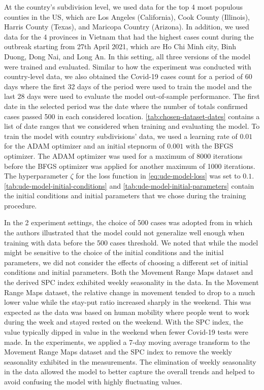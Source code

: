 At the country's subdivision level, we used data for the top 4 most populous counties in the \gls{US}, which are Los Angeles (California), Cook County (Illinois), Harris County (Texas), and Maricopa Country (Arizona).
In addition, we used data for the 4 provinces in Vietnam that had the highest cases count during the outbreak starting from 27th April 2021, which are Ho Chi Minh city, Binh Duong, Dong Nai, and Long An.
In this setting, all three versions of the model were trained and evaluated.
Similar to how the experiment was conducted with country-level data, we also obtained the Covid-19 cases count for a period of 60 days where the first 32 days of the period were used to train the model and the last 28 days were used to evaluate the model out-of-sample performance.
The first date in the selected period was the date where the number of totals confirmed cases passed 500 in each considered location.
\autoref{tab:chosen-dataset-dates} contains a list of date ranges that we considered when training and evaluating the model.
To train the model with country subdivisions' data, we used a learning rate of $0.01$ for the ADAM optimizer and an initial stepnorm of $0.001$ with the BFGS optimizer.
The ADAM optimizer was used for a maximum of 8000 iterations before the BFGS optimizer was applied for another maximum of 1000 iterations.
The hyperparameter $\zeta$ for the loss function in \autoref{eq:ude-model-loss} was set to $0.1$.
\autoref{tab:ude-model-initial-conditions} and \autoref{tab:ude-model-initial-parameters} contain the initial conditions and initial parameters that we chose during the training procedure.

In the 2 experiment settings, the choice of 500 cases was adopted from \cite{dandekarMachineLearningAidedGlobal2020a} in which the authors illustrated that the model could not generalize well enough when training with data before the 500 cases threshold.
We noted that while the model might be sensitive to the choice of the initial conditions and the initial parameters, we did not consider the effects of choosing a different set of initial conditions and initial parameters.
Both the Movement Range Maps dataset and the derived \gls{SPC} index exhibited weekly seasonality in the data.
In the Movement Range Maps dataset, the relative change in movement tended to drop to a much lower value while the stay-put ratio increased sharply in the weekend.
This was expected as the data was based on human mobility where people went to work during the week and stayed rested on the weekend.
With the \gls{SPC} index, the value typically dipped in value in the weekend when fewer Covid-19 tests were made.
In the experiments, we applied a 7-day moving average transform to the Movement Range Maps dataset and the \gls{SPC} index to remove the weekly seasonality exhibited in the measurements.
The elimination of weekly seasonality in the data allowed the model to better capture the overall trends and helped to avoid confusing the model with highly fluctuating values.

